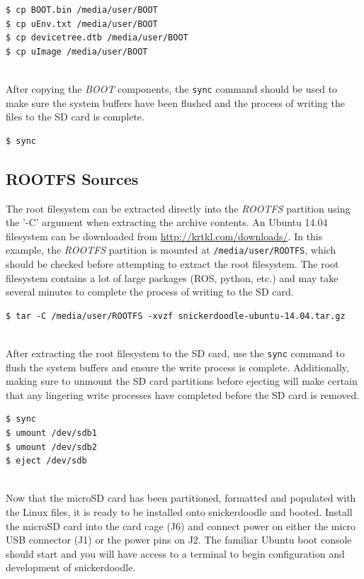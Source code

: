 \begin{lstlisting}
$ cp BOOT.bin /media/user/BOOT
$ cp uEnv.txt /media/user/BOOT
$ cp devicetree.dtb /media/user/BOOT
$ cp uImage /media/user/BOOT
\end{lstlisting}

~\\
\noindent
After copying the \textit{BOOT} components, the \texttt{sync} command should be used to make sure the system buffers have been flushed and the process of writing the files to the SD card is complete. \\

\begin{lstlisting}
$ sync
\end{lstlisting}

\subsection{ROOTFS Sources}

The root filesystem can be extracted directly into the \textit{ROOTFS} partition using the '-C' argument when extracting the archive contents. An Ubuntu 14.04 filesystem can be downloaded from \url{http://krtkl.com/downloads/}. In this example, the \textit{ROOTFS} partition is mounted at \texttt{/media/user/ROOTFS}, which should be checked before attempting to extract the root filesystem. The root filesystem contains a lot of large packages (ROS, python, etc.) and may take several minutes to complete the process of writing to the SD card. \\

\begin{lstlisting}
$ tar -C /media/user/ROOTFS -xvzf snickerdoodle-ubuntu-14.04.tar.gz
\end{lstlisting}


~\\
\noindent
After extracting the root filesystem to the SD card, use the \texttt{sync} command to flush the system buffers and ensure the write process is complete. Additionally, making sure to unmount the SD card partitions before ejecting will make certain that any lingering write processes have completed before the SD card is removed. \\


\begin{lstlisting}
$ sync
$ umount /dev/sdb1
$ umount /dev/sdb2
$ eject /dev/sdb
\end{lstlisting}


~\\
\noindent
Now that the microSD card has been partitioned, formatted and populated with the Linux files, it is ready to be installed onto snickerdoodle and booted. Install the microSD card into the card cage (J6) and connect power on either the micro USB connector (J1) or the power pins on J2. The familiar Ubuntu boot console should start and you will have access to a terminal to begin configuration and development of snickerdoodle. 

